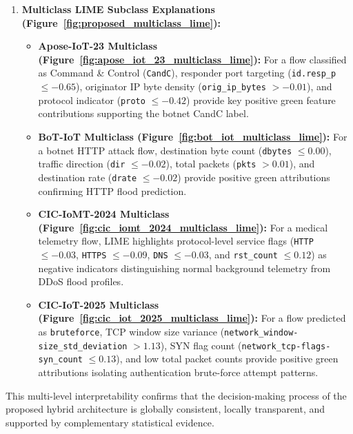 \documentclass[a4paper,fleqn]{cas-sc}
\begin{document}
\begin{enumerate}
    \item \textbf{Multiclass LIME Subclass Explanations (Figure~\ref{fig:proposed_multiclass_lime}):}
    \begin{itemize}
        \item \textbf{Apose-IoT-23 Multiclass (Figure~\ref{fig:apose_iot_23_multiclass_lime}):} For a flow classified as Command \& Control (\texttt{CandC}), responder port targeting (\texttt{id.resp\_p} $\le -0.65$), originator IP byte density (\texttt{orig\_ip\_bytes} $> -0.01$), and protocol indicator (\texttt{proto} $\le -0.42$) provide key positive green feature contributions supporting the botnet CandC label.
        \item \textbf{BoT-IoT Multiclass (Figure~\ref{fig:bot_iot_multiclass_lime}):} For a botnet HTTP attack flow, destination byte count (\texttt{dbytes} $\le 0.00$), traffic direction (\texttt{dir} $\le -0.02$), total packets (\texttt{pkts} $> 0.01$), and destination rate (\texttt{drate} $\le -0.02$) provide positive green attributions confirming HTTP flood prediction.
        \item \textbf{CIC-IoMT-2024 Multiclass (Figure~\ref{fig:cic_iomt_2024_multiclass_lime}):} For a medical telemetry flow, LIME highlights protocol-level service flags (\texttt{HTTP} $\le -0.03$, \texttt{HTTPS} $\le -0.09$, \texttt{DNS} $\le -0.03$, and \texttt{rst\_count} $\le 0.12$) as negative indicators distinguishing normal background telemetry from DDoS flood profiles.
        \item \textbf{CIC-IoT-2025 Multiclass (Figure~\ref{fig:cic_iot_2025_multiclass_lime}):} For a flow predicted as \texttt{bruteforce}, TCP window size variance (\texttt{network\_window-size\_std\_deviation} $> 1.13$), SYN flag count (\texttt{network\_tcp-flags-syn\_count} $\le 0.13$), and low total packet counts provide positive green attributions isolating authentication brute-force attempt patterns.
    \end{itemize}
\end{enumerate}
This multi-level interpretability confirms that the decision-making process of the proposed hybrid architecture is globally consistent, locally transparent, and supported by complementary statistical evidence.
\end{document}
